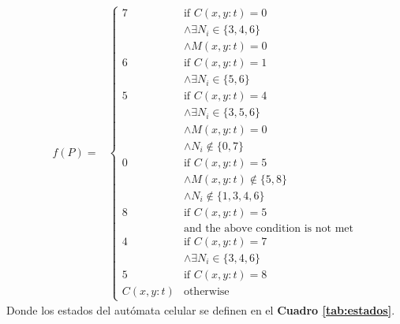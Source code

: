         \begin{equation*}
                \begin{aligned}
                f(P) = & \begin{cases}
                    7 & \text{if } C(x,y:t) = 0 \\
                      & \land \exists N_i \in \{3, 4, 6\} \\
                      & \land M(x,y:t) = 0 \\
                    6 & \text{if } C(x,y:t) = 1 \\
                      & \land \exists N_i \in \{5, 6\} \\
                    5 & \text{if } C(x,y:t) = 4 \\
                      & \land \exists N_i \in \{3, 5, 6\} \\
                      & \land M(x,y:t) = 0 \\
                      & \land N_i \not\in \{0, 7\} \\
                    0 & \text{if } C(x,y:t) = 5 \\
                      & \land M(x,y:t) \not\in \{5, 8\} \\
                      & \land N_i \not\in \{1, 3, 4, 6\} \\
                    8 & \text{if } C(x,y:t) = 5 \\
                      & \text{and the above condition is not met} \\
                    4 & \text{if } C(x,y:t) = 7 \\
                      & \land \exists N_i \in \{3, 4, 6\} \\
                    5 & \text{if } C(x,y:t) = 8 \\
                    C(x,y:t) & \text{otherwise}
                \end{cases}
                \end{aligned}
            \end{equation*}
    Donde los estados del aut\'omata celular se definen en el \textbf{Cuadro \ref{tab:estados}}.
    \vskip 0.5cm
